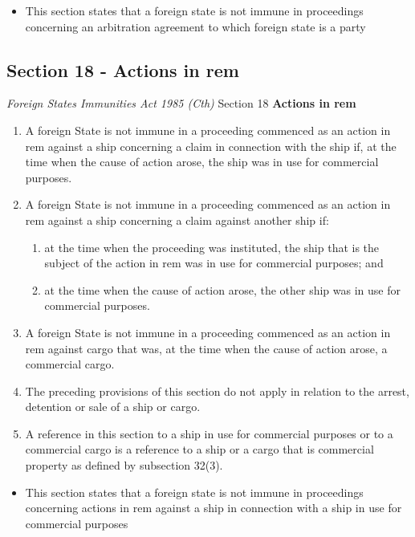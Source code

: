\begin{itemize}
    \item This section states that a foreign state is not immune in proceedings concerning an arbitration agreement to which foreign state is a party
\end{itemize}

\subsection{Section 18 - Actions in rem}
\begin{statutedetails}{\textit{Foreign States Immunities Act 1985 (Cth)} Section 18}
    \flushleft
    \textbf{Actions in rem}
    \begin{enumerate}[label=(\arabic*)]
        \item A foreign State is not immune in a proceeding commenced as an action \gls{in rem} against a ship concerning a claim in connection with the ship if, at the time when the cause of action arose, the ship was in use for commercial purposes.
        \item A foreign State is not immune in a proceeding commenced as an action \gls{in rem} against a ship concerning a claim against another ship if:
        \begin{enumerate}[label=(\alph*)]
            \item at the time when the proceeding was instituted, the ship that is the subject of the action \gls{in rem} was in use for commercial purposes; and
            \item at the time when the cause of action arose, the other ship was in use for commercial purposes.
        \end{enumerate}
        \item A foreign State is not immune in a proceeding commenced as an action \gls{in rem} against cargo that was, at the time when the cause of action arose, a commercial cargo.
        \item The preceding provisions of this section do not apply in relation to the arrest, detention or sale of a ship or cargo.
        \item A reference in this section to a ship in use for commercial purposes or to a commercial cargo is a reference to a ship or a cargo that is commercial property as defined by subsection 32(3).
    \end{enumerate}
\end{statutedetails}

\begin{itemize}
    \item This section states that a foreign state is not immune in proceedings concerning actions \gls{in rem} against a ship in connection with a ship in use for commercial purposes
\end{itemize}

